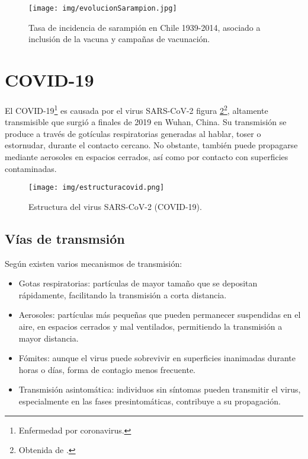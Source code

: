 \begin{figure}[H]
        \centering
        \texttt{[image: img/evolucionSarampion.jpg]}
        \caption{Tasa de incidencia de sarampión en Chile 1939-2014, asociado a inclusión de la vacuna y campañas de vacunación.}
        \label{fig:evolución sarampión}
        \vspace{0.5cm} %
\end{figure}

\section{COVID-19}
El COVID-19\footnote{Enfermedad por coronavirus.} es causada por el virus SARS-CoV-2 figura \ref{fig:covid estructura}\footnote{Obtenida de \cite{medlineplus_sarscov2}.}, altamente transmisible que surgió a finales de 2019 en Wuhan, China. Su transmisión se produce a través de gotículas respiratorias generadas al hablar, toser o estornudar, durante el contacto cercano. No obstante, también puede propagarse mediante aerosoles en espacios cerrados, así como por contacto con superficies contaminadas.

\begin{figure}[H]
        \centering
        \texttt{[image: img/estructuracovid.png]}
        \caption{Estructura del virus SARS-CoV-2 (COVID-19).}
        \label{fig:covid estructura}
        \vspace{0.5cm} %
\end{figure}

\subsection{Vías de transmsión}
Según \cite{wiersinga2020covid19}existen varios mecanismos de transmisión:
\begin{itemize}
    \item Gotas respiratorias: partículas de mayor tamaño que se depositan rápidamente, facilitando la transmisión a corta distancia.
    \item Aerosoles: partículas más pequeñas que pueden permanecer suspendidas en el aire, en espacios cerrados y mal ventilados, permitiendo la transmisión a mayor distancia.
    \item Fómites: aunque el virus puede sobrevivir en superficies inanimadas durante horas o días, forma de contagio menos frecuente.
    \item Transmisión asintomática: individuos sin síntomas pueden transmitir el virus, especialmente en las fases presintomáticas, contribuye a su propagación.
\end{itemize}

